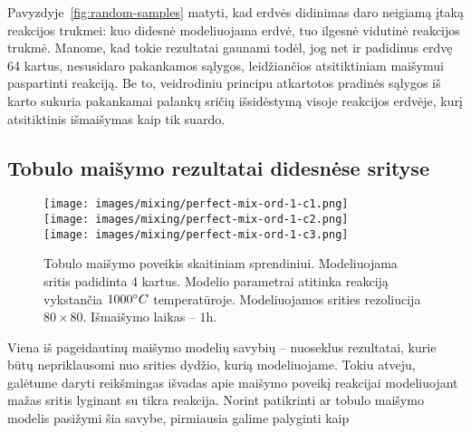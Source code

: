 Pavyzdyje~\ref{fig:random-samples} matyti, kad erdvės didinimas daro neigiamą įtaką reakcijos trukmei: kuo didesnė modeliuojama erdvė, tuo ilgesnė vidutinė reakcijos trukmė. Manome, kad tokie rezultatai gaunami todėl, jog net ir padidinus erdvę 64 kartus, nesusidaro pakankamos sąlygos, leidžiančios atsitiktiniam maišymui paspartinti reakciją. Be to, veidrodiniu principu atkartotos pradinės sąlygos iš karto sukuria pakankamai palankų sričių išsidėstymą visoje reakcijos erdvėje, kurį atsitiktinis išmaišymas kaip tik suardo.

\subsection{Tobulo maišymo rezultatai didesnėse srityse}

\begin{figure}[h!]
  \centering
  \texttt{[image: images/mixing/perfect-mix-ord-1-c1.png]} \\ 
  \texttt{[image: images/mixing/perfect-mix-ord-1-c2.png]} \\
  \texttt{[image: images/mixing/perfect-mix-ord-1-c3.png]}
  \caption{Tobulo maišymo poveikis skaitiniam sprendiniui. Modeliuojama sritis padidinta 4 kartus. Modelio parametrai atitinka reakciją vykstančia $1000\degree C$ temperatūroje. Modeliuojamos srities rezoliucija $80\times80$. Išmaišymo laikas -- $1\text{h}. $}
  \label{fig:perfect-mix-larger-example}
\end{figure}



Viena iš pageidautinų maišymo modelių savybių -- nuoseklus rezultatai, kurie būtų nepriklausomi nuo srities dydžio, kurią modeliuojame. Tokiu atveju, galėtume daryti reikšmingas išvadas apie maišymo poveikį reakcijai modeliuojant mažas sritis lyginant su tikra reakcija. Norint patikrinti ar tobulo maišymo modelis pasižymi šia savybe, pirmiausia galime palyginti kaip 

